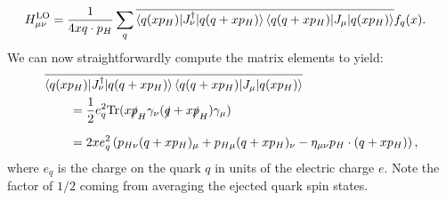 \documentclass[withindex,glossary]{cam-thesis}
\begin{document}
\begin{align}
H_{\mu\nu}^{\text{LO}} &= \frac{1}{4 x q \cdot p_H} \sum_{q} \overline{\braket{q(x p_H) | J_{\nu}^{\dagger} | q(q + x p_H)}\braket{q(q + x p_H) | J_{\mu} | q(x p_H) }} f_q(x).
\end{align}
We can now straightforwardly compute the matrix elements to yield:
\begin{align}
&\overline{\braket{q(x p_H) | J_{\nu}^{\dagger} | q(q + x p_H)}\braket{q(q + x p_H) | J_{\mu} | q(x p_H) }} \notag\\
&\qquad= \frac{1}{2} e_q^2 \textrm{Tr}(x \slashed{p}_H \gamma_{\nu} (\slashed{q} + x \slashed{p}_H) \gamma_{\mu}) \\[1.5ex]
&\qquad = 2x e_q^2 \left( p_{H\nu} (q + x p_H)_{\mu} + p_{H\mu} (q + x p_H)_{\nu} - \eta_{\mu\nu} p_H \cdot (q + x p_H) \right),\notag
\end{align}
where $e_q$ is the charge on the quark $q$ in units of the electric charge $e$. Note the factor of $1/2$ coming from averaging the ejected quark spin states.
\end{document}

